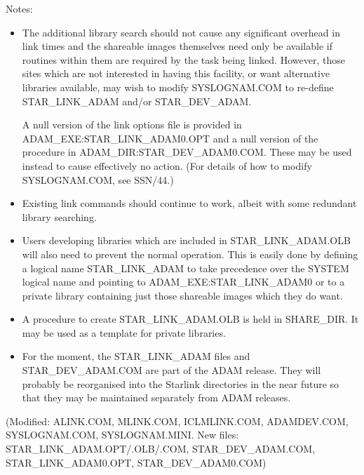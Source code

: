 Notes:
\begin{itemize}

\item The additional library search should not cause any significant overhead
in link times and the shareable images themselves need only be available if 
routines within them are required by the task being linked.
However, those sites which are not interested in having this facility, or want
alternative libraries available, may wish to modify SYSLOGNAM.COM
to re-define STAR\_LINK\_ADAM and/or STAR\_DEV\_ADAM.

A null version of the link options file is provided in 
ADAM\_EXE:STAR\_LINK\_ADAM0.OPT and a null version of the procedure in
ADAM\_DIR:STAR\_DEV\_ADAM0.COM.
These may be used instead to cause effectively no action.
(For details of how to modify SYSLOGNAM.COM, see SSN/44.)

\item Existing link commands should continue to work, albeit with some
redundant library searching.

\item Users developing libraries which are included in 
STAR\_LINK\_ADAM.OLB will also need to prevent the normal operation.
This is easily done by defining a logical name STAR\_LINK\_ADAM to take 
precedence over the SYSTEM logical name and pointing to 
ADAM\_EXE:\-STAR\-\_LINK\_ADAM0 or to a
private library containing just those shareable images which they do want.

\item A procedure to create STAR\_LINK\_ADAM.OLB is held in SHARE\_DIR.
It may be used as a template for private libraries.

\item For the moment, the STAR\_LINK\_ADAM files and STAR\_DEV\_ADAM.COM
are part of the ADAM release.
They will probably be reorganised into the Starlink directories in the near 
future so that they may be maintained separately from ADAM releases.
\end{itemize}

(Modified: ALINK.COM, MLINK\-.COM, ICLMLINK.COM,
ADAM\-DEV\-.COM, SYS\-LOG\-NAM\-.COM, SYS\-LOG\-NAM\-.MINI.
 New files: STAR\-\_LINK\-\_ADAM\-.OPT/\-.OLB/\-.COM, STAR\-\_DEV\-\_ADAM\-.COM,
STAR\-\_LINK\-\_ADAM0\-.OPT, STAR\-\_DEV\-\_ADAM0\-.COM)

